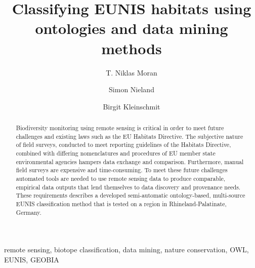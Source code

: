 \documentclass[authoryear, review,12pt,number]{elsarticle}
\begin{document}


%
\lstset{language=XML}

\begin{frontmatter}
\linenumbers
\title{Classifying EUNIS habitats using ontologies and data mining methods}

\author[TUB]{T. Niklas Moran}

\author[TUB]{Simon Nieland}
\author[TUB]{Birgit Kleinschmit}

\address[TUB]{Geoinformation in Environmental Planning Lab, Technische
Universit\"at Berlin, Stra\ss e des 17. Juni 145, 10623 Berlin, Germany}


\begin{abstract}
Biodiversity monitoring using remote sensing is critical in order to 
meet future challenges and existing laws such as the EU Habitats Directive. The 
subjective nature of field surveys, conducted to meet reporting guidelines of  
the Habitats Directive, combined with differing nomenclatures and procedures 
of EU member state environmental agencies hampers data exchange and comparison. 
Furthermore, manual field surveys are expensive and time-consuming. To meet 
these future challenges automated tools are needed to use remote 
sensing data to produce comparable, empirical data outputs that lend 
themselves to data discovery and provenance needs. These requirements describes 
a developed semi-automatic ontology-based, multi-source EUNIS classification 
method that is tested on a region in Rhineland-Palatinate, Germany. 
\end{abstract}

\begin{keyword}
remote sensing, biotope classification, data mining, nature conservation, OWL, 
EUNIS, GEOBIA
\end{keyword}
\end{frontmatter}
\linenumbers
\end{document}
